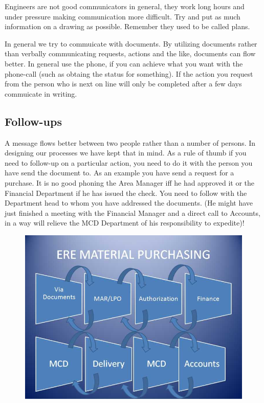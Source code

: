 Engineers are not good communicators in general, they work long hours and under pressure making communication more difficult. Try and put as much information on
a drawing as possible. Remember they used to be called plans.


In general we try to commuicate with documents. By utilizing documents rather than verbally communicating requests, actions and the like, documents can flow better. In general use the phone, if you can achieve what you want with the phone-call (such as obtaing the status for something). If the action you request from the person who is next on line will only be completed after a few days commuicate in writing.

\subsection*{Follow-ups}

A message flows better between two people rather than a number of persons. In designing our processes we have kept that in mind. As a rule of thumb if you need to follow-up on a particular action, you need to do it with the person you have send the document to. As an example you have send a request for a purchase. It is no good phoning the Area Manager iff he had approved it or the Financial Department if he has issued the check. You need to follow with the Department head to whom you have addressed the documents. (He might have just finished a meeting with the Financial Manager and a direct call to Accounts, in a way will relieve the MCD Department of his responsibility to expedite)!

\begin{figure}
\includegraphics[width=\textwidth]{./graphics/process-01}
\end{figure}

